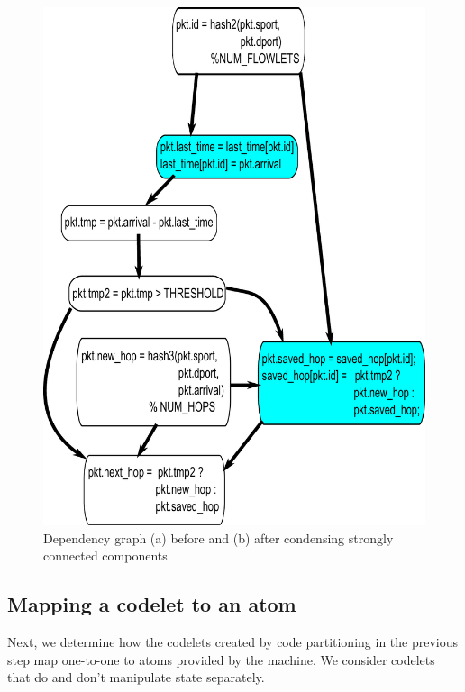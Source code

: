 \begin{figure}[!t]
\begin{minipage}{0.5\textwidth}
\includegraphics[width=\columnwidth]{scc.pdf}
\end{minipage}
\caption{Dependency graph (a) before and (b) after condensing strongly connected components}
\label{fig:partitioning}
\end{figure}

\subsection{Mapping a codelet to an atom}
\label{ss:code_gen}
Next, we determine how the codelets created by code partitioning in the
previous step map one-to-one to atoms provided by the \absmachine machine. We
consider codelets that do and don't manipulate state separately.

